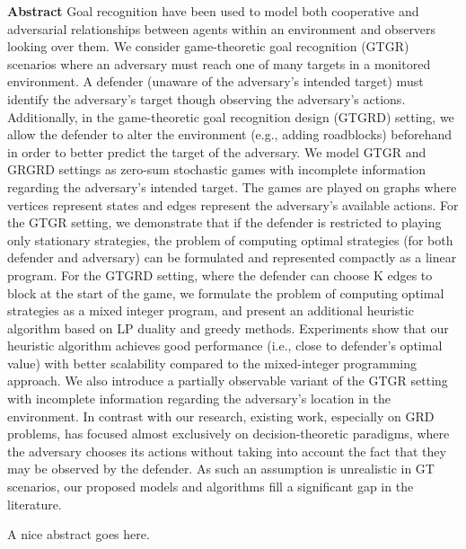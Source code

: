 %
%

\begin{center}

\bigskip

\begin{Large}
\textbf{\theTitle}
\end{Large}

\bigskip

\begin{large}
\theAuthor
\end{large}

\bigskip
\bigskip

\textbf{Abstract}
Goal recognition have been used to model both cooperative and adversarial relationships between agents within an environment and observers looking over them.
We consider game-theoretic goal recognition (GTGR) scenarios where an adversary must reach one of many targets in a monitored environment. A defender (unaware of the adversary’s intended target) must identify the adversary’s target though observing the adversary’s actions. Additionally, in the game-theoretic goal recognition design (GTGRD) setting,  we allow the defender to alter the environment (e.g., adding roadblocks) beforehand in order to better predict the target of the adversary. We  model GTGR and GRGRD settings as zero-sum stochastic games with incomplete information regarding the adversary’s intended target. The games are played on graphs where vertices represent states and edges represent the adversary’s available actions. For the GTGR setting, we demonstrate that if the defender is restricted to playing only stationary strategies, the problem of computing optimal strategies (for both defender and adversary) can be formulated and represented compactly as a linear program. For the GTGRD setting, where the defender can choose K edges to block at the start of the game, we formulate the problem of computing optimal strategies as a mixed integer program, and present an additional heuristic algorithm based on LP duality and greedy methods. Experiments show that our heuristic algorithm achieves good performance (i.e., close to defender’s optimal value) with better scalability compared to the mixed-integer programming approach. We also introduce a partially observable variant of the GTGR setting with incomplete information regarding the adversary's location in the environment. In contrast with our research, existing work, especially on GRD problems, has focused almost exclusively on decision-theoretic paradigms, where the adversary chooses its actions without taking into account the fact that they may be observed by the defender. As such an assumption is unrealistic in GT scenarios, our proposed models and algorithms fill a significant gap in the literature. 


\end{center}

\noindent
A nice abstract goes here.

